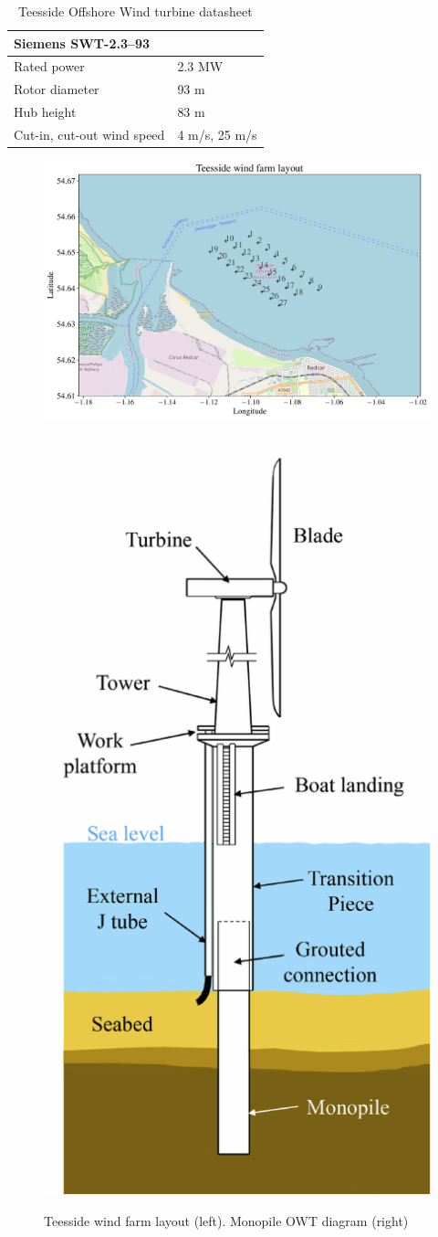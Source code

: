 
\begin{table}
    \centering
    \caption{Teesside Offshore Wind turbine datasheet}
    \begin{tabular}{ll}
     \hline
     \multicolumn{2}{l}{Siemens SWT-2.3–93} \\ \hline
        Rated power & 2.3 MW\\
        Rotor diameter & 93 m\\
        Hub height & 83 m\\
        Cut-in, cut-out wind speed & 4 m/s, 25 m/s\\\hline
    \end{tabular}
    \label{tab:owt_datasheet}
\end{table}

\begin{figure}
\begin{center}
    \includegraphics[width=0.6\linewidth]{part2/figures/DCE/teesside/map_teesside_layout.pdf}
    \includegraphics[width=0.25\linewidth]{part2/figures/DCE/teesside/owt_diagram.pdf}
\end{center}
\caption{Teesside wind farm layout (left). Monopile OWT diagram \citep{chen_2018_owt_diagram} (right)}
\label{fig:teesside_layout}
\end{figure}

